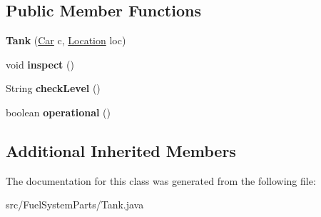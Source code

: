 \subsection*{Public Member Functions}
\begin{DoxyCompactItemize}
\item 
\hypertarget{classFuelSystemParts_1_1Tank_acfde50b0b363fd26bef4c1d7c9957be2}{}{\bfseries Tank} (\hyperlink{classCars_1_1Car}{Car} c, \hyperlink{enumEnums_1_1Location}{Location} loc)\label{classFuelSystemParts_1_1Tank_acfde50b0b363fd26bef4c1d7c9957be2}

\item 
\hypertarget{classFuelSystemParts_1_1Tank_a4004153aac241d2dcb6be3a6895913dd}{}void {\bfseries inspect} ()\label{classFuelSystemParts_1_1Tank_a4004153aac241d2dcb6be3a6895913dd}

\item 
\hypertarget{classFuelSystemParts_1_1Tank_aff282084e1b30f12ca10ca6c760a55c0}{}String {\bfseries check\+Level} ()\label{classFuelSystemParts_1_1Tank_aff282084e1b30f12ca10ca6c760a55c0}

\item 
\hypertarget{classFuelSystemParts_1_1Tank_a5bb105d8d2d4fe2784476cc938360edf}{}boolean {\bfseries operational} ()\label{classFuelSystemParts_1_1Tank_a5bb105d8d2d4fe2784476cc938360edf}

\end{DoxyCompactItemize}
\subsection*{Additional Inherited Members}


The documentation for this class was generated from the following file\+:\begin{DoxyCompactItemize}
\item 
src/\+Fuel\+System\+Parts/Tank.\+java\end{DoxyCompactItemize}
